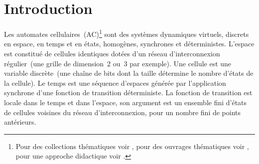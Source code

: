 \chapter{Introduction}

Les automates cellulaires~(AC)\footnote{%
  Pour des collections th\'ematiques voir
  \cite{Demongeot85,Wolfram86a,Legendi87,Gutowitz90a}, %
  pour des ouvrages th\'ematiques voir
  \cite{Preston84,Toffoli87,Jackson91c}, %
  pour une approche didactique voir %
  \cite{Casti89a,Schroeder90a}.} %
sont des syst\`emes dynamiques virtuels, %
discrets en espace, en temps et en \'etats, homog\`enes, synchrones et
d\'eterministes. %
L'espace est constitu\'e de cellules identiques dot\'ees d'un r\'eseau
d'interconnexion r\'egulier~(une grille de dimension~2 ou~3 par
exemple). %
Une cellule est une variable discr\`ete~(une cha\^ine de bits dont la
taille d\'etermine le nombre d'\'etats de la cellule). %
Le temps est une s\'equence d'espaces g\'en\'er\'ee par l'application
synchrone d'une fonction de transition d\'eterministe. %
La fonction de transition est locale dans le temps et dans l'espace,
son argument est un ensemble fini d'\'etats de cellules voisines du
r\'eseau d'interconnexion, pour un nombre fini de points ant\'erieurs. %

